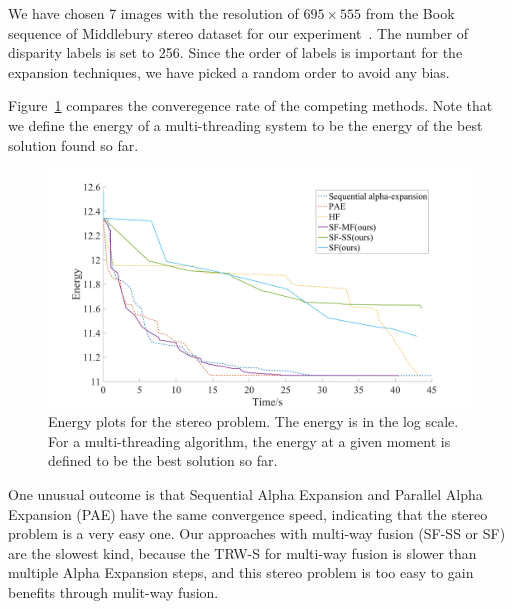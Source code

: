 
\noindent We have chosen 7 images with the resolution of $695\times555$
from the Book sequence of Middlebury stereo dataset for our
experiment~\cite{middlebury_stereo}. The number of disparity labels is
set to 256.
%
Since the order of labels is important for the expansion techniques,
we have picked a random order to avoid any bias.
%



Figure~\ref{fig:stereo_global} compares the converegence rate of the
competing methods. Note that we define the energy of a multi-threading
system to be the energy of the best solution found so far.
%
\begin{figure}[tb]
  \includegraphics[width=\columnwidth]{figure/stereo_global.png}
 \caption{Energy plots for the stereo problem. The energy is in the log
 scale. For a multi-threading algorithm, the energy at a given moment is
 defined to be the best solution so far.} \label{fig:stereo_global}
\end{figure}
%
One unusual outcome is that Sequential Alpha Expansion and Parallel
Alpha Expansion (PAE) have the same convergence speed, indicating that
the stereo problem is a very easy one.
Our approaches with multi-way fusion (SF-SS or SF) are the slowest kind,
because the TRW-S for multi-way fusion is slower than multiple Alpha
Expansion steps, and this stereo problem is too easy to gain benefits
through mulit-way fusion.
%
